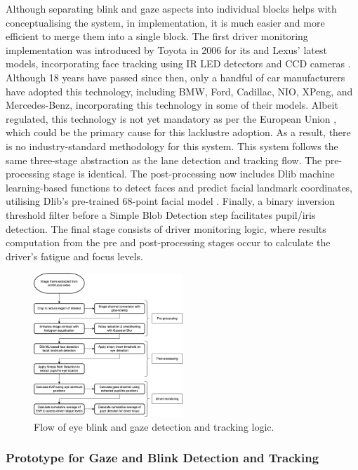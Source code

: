 \documentclass[10pt,conference]{IEEEtran}
\begin{document}
Although separating blink and gaze aspects into individual blocks helps with conceptualising the system, in implementation, it is much easier and more efficient to merge them into a single block. The first driver monitoring implementation was introduced by Toyota in 2006 for its and Lexus' latest models, incorporating face tracking using IR LED detectors and CCD cameras \cite{b11}. Although 18 years have passed since then, only a handful of car manufacturers have adopted this technology, including BMW, Ford, Cadillac, NIO, XPeng, and Mercedes-Benz, incorporating this technology in some of their models. Albeit regulated, this technology is not yet mandatory as per the European Union \cite{b12}, which could be the primary cause for this lacklustre adoption. As a result, there is no industry-standard methodology for this system. This system follows the same three-stage abstraction as the lane detection and tracking flow. The pre-processing stage is identical. The post-processing now includes Dlib machine learning-based functions \cite{b13} to detect faces and predict facial landmark coordinates, utilising Dlib's pre-trained 68-point facial model \cite{b14}. Finally, a binary inversion threshold filter before a Simple Blob Detection step facilitates pupil/iris detection. The final stage consists of driver monitoring logic, where results computation from the pre and post-processing stages occur to calculate the driver's fatigue and focus levels.

\begin{figure}[htbp]
    \centerline{\includegraphics[width=0.5\textwidth]{assets/eye-detection-flow.png}}
    \caption{Flow of eye blink and gaze detection and tracking logic.}
    \label{f5}
\end{figure}

\subsubsection{Prototype for Gaze and Blink Detection and Tracking}
\end{document}
